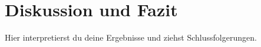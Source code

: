 
\section{Diskussion und Fazit}
\label{chap:diskussion}

Hier interpretierst du deine Ergebnisse und ziehst Schlussfolgerungen.